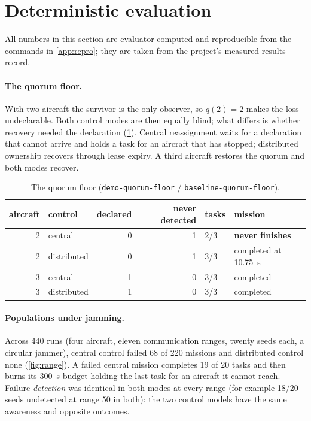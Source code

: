 \documentclass[a4paper,11pt]{article}
\newcommand{\code}[1]{\texttt{\codebreaks#1\endcodebreaks}}
\def\codebreaks{\begingroup\def\_{\textunderscore\allowbreak}\def\/{/\allowbreak}}
\def\endcodebreaks{\endgroup}
\begin{document}
\section{Deterministic evaluation}\label{sec:sim}

All numbers in this section are evaluator-computed and reproducible from the
commands in \cref{app:repro}; they are taken from the project's measured-results
record.

\paragraph{The quorum floor.} With two aircraft the survivor is the only
observer, so $q(2)=2$ makes the loss undeclarable. Both control modes are then
equally blind; what differs is whether recovery needed the declaration
(\cref{tab:floor}). Central reassignment waits for a declaration that cannot
arrive and holds a task for an aircraft that has stopped; distributed ownership
recovers through lease expiry. A third aircraft restores the quorum and both
modes recover.

\begin{table}[t]
\centering\small
\caption{The quorum floor (\code{demo-quorum-floor} / \code{baseline-quorum-floor}).}
\label{tab:floor}
\begin{tabular}{@{}rlrrll@{}}
\toprule
aircraft & control & declared & never detected & tasks & mission \\
\midrule
2 & central     & 0 & 1 & 2/3 & \textbf{never finishes} \\
2 & distributed & 0 & 1 & 3/3 & completed at \SI{10.75}{s} \\
3 & central     & 1 & 0 & 3/3 & completed \\
3 & distributed & 1 & 0 & 3/3 & completed \\
\bottomrule
\end{tabular}
\end{table}

\paragraph{Populations under jamming.} Across 440 runs (four aircraft, eleven
communication ranges, twenty seeds each, a circular jammer), central control
failed 68 of 220 missions and distributed control none (\cref{fig:range}). A
failed central mission completes 19 of 20 tasks and then burns its
\SI{300}{s} budget holding the last task for an aircraft it cannot reach.
Failure \emph{detection} was identical in both modes at every range (for
example 18/20 seeds undetected at range 50 in both): the two control models
have the same awareness and opposite outcomes.
\end{document}
